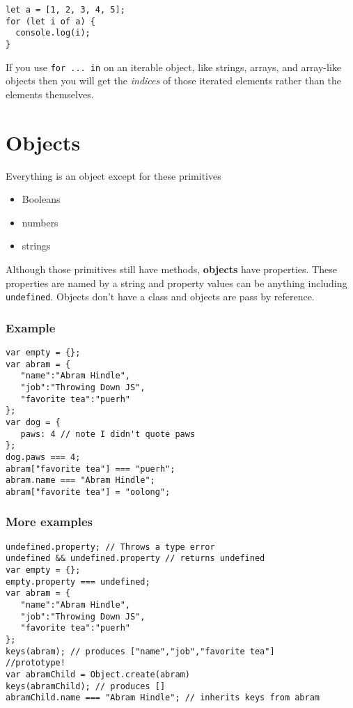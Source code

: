 \documentclass[../CMPUT-404-Notes.tex]{subfiles}
\begin{document}
\begin{verbatim}
let a = [1, 2, 3, 4, 5];
for (let i of a) {
  console.log(i);
}
\end{verbatim}

If you use \texttt{for ... in} on an iterable object, like strings, arrays, and array-like objects then you will get the \emph{indices} of those iterated elements rather than the elements themselves. 


\section{Objects}
Everything is an object except for these primitives
\begin{itemize}
    \item Booleans
    \item numbers
    \item strings   
\end{itemize}
Although those primitives still have methods, \textbf{objects} have properties.
These properties are named by a string and property values can be anything including \texttt{undefined}.
Objects don't have a class and objects are pass by reference.

\subsubsection{Example}
\begin{verbatim}
var empty = {};
var abram = {
   "name":"Abram Hindle",
   "job":"Throwing Down JS",
   "favorite tea":"puerh"
};
var dog = {
   paws: 4 // note I didn't quote paws
};
dog.paws === 4;
abram["favorite tea"] === "puerh";
abram.name === "Abram Hindle";
abram["favorite tea"] = "oolong";   
\end{verbatim}

\subsubsection{More examples}
\begin{verbatim}
undefined.property; // Throws a type error
undefined && undefined.property // returns undefined
var empty = {};
empty.property === undefined;
var abram = {
   "name":"Abram Hindle",
   "job":"Throwing Down JS",
   "favorite tea":"puerh"
};
keys(abram); // produces ["name","job","favorite tea"]
//prototype!
var abramChild = Object.create(abram)
keys(abramChild); // produces []
abramChild.name === "Abram Hindle"; // inherits keys from abram
\end{verbatim}
\end{document}
